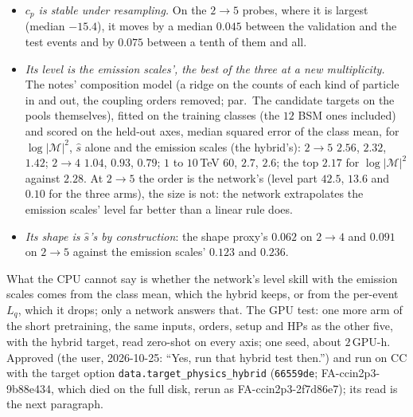 \documentclass[11pt]{article}
\newcommand{\code}[1]{\texttt{#1}}
\begin{document}
\begin{itemize}
  \item \emph{$c_p$ is stable under resampling.} On the $2\to5$ probes, where it is largest (median $-15.4$), it moves by
    a median $0.045$ between the validation and the test events and by $0.075$ between a tenth of them and all.
  \item \emph{Its level is the emission scales', the best of the three at a new multiplicity.} The notes' composition
    model (a ridge on the counts of each kind of particle in and out, the coupling orders removed; par.\ The candidate
    targets on the pools themselves), fitted on the training classes (the $12$ BSM ones included) and scored on the held-out
    axes, median squared error of the class mean, for $\log|\mathcal M|^2$, $\hat s$ alone and the emission scales (the
    hybrid's): $2\to5$ $2.56$, $2.32$, $1.42$; $2\to4$ $1.04$, $0.93$, $0.79$; $1$ to $10$\,TeV $60$, $2.7$, $2.6$; the top
    $2.17$ for $\log|\mathcal M|^2$ against $2.28$. At $2\to5$ the order is the network's (level part $42.5$, $13.6$ and
    $0.10$ for the three arms), the size is not: the network extrapolates the emission scales' level far better than a
    linear rule does.
  \item \emph{Its shape is $\hat s$'s by construction}: the shape proxy's $0.062$ on $2\to4$ and $0.091$ on $2\to5$
    against the emission scales' $0.123$ and $0.236$.
\end{itemize}
What the CPU cannot say is whether the network's level skill with the emission scales comes from the class mean, which
the hybrid keeps, or from the per-event $L_q$, which it drops; only a network answers that. The GPU test: one more arm
of the short pretraining, the same inputs, orders, setup and HPs as the other five, with the hybrid target, read
zero-shot on every axis; one seed, about $2$\,GPU-h. Approved (the user, 2026-10-25: ``Yes, run that hybrid test
then.'') and run on CC with the target option \code{data.target\_physics\_hybrid} (\code{66559de};
FA-ccin2p3-9b88e434, which died on the full disk, rerun as FA-ccin2p3-2f7d86e7); its read is the next paragraph.
\end{document}
